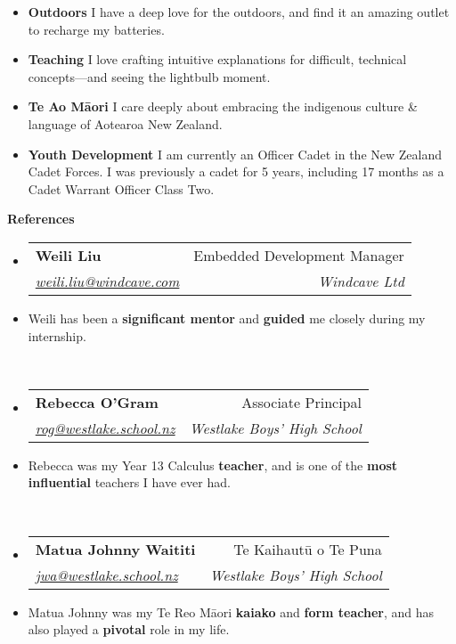 \documentclass[11pt,a4paper]{article}[leftmargin=*]
\makeatletter
\def \entryspacing {-0pt}
\renewcommand{\section}[2]{\vspace{5pt}
  \colorbox{secondary}{\color{white}\raggedbottom\normalsize\textbf{{#1}{\hspace{2pt}#2\hspace{4pt}}}}
}
\newcommand{\resumeEntryStart}{\begin{itemize}[leftmargin=2.5mm]}
\newcommand{\resumeEntryEnd}{\end{itemize}\vspace{\entryspacing}}
\newcommand{\resumeEntryTSDL}[4]{
  \vspace{-1pt}\item[]
    \begin{tabularx}{0.97\textwidth}{X@{\hspace{60pt}}r}
      \textbf{\color{primary}#1} & {\firabook\color{accent}\small#2} \\
      \textit{\color{accent}\small#3} & \textit{\color{accent}\small#4} \\
    \end{tabularx}\vspace{-6pt}
}
\newcommand{\resumeEntryS}[2]{
  \item[]\small{
    \textbf{\color{primary}#1 }{ #2 \vspace{-4pt}}
  }
}
\newcommand{\resumeEntryP}[1]{
  \item[]\small{
    #1 \vspace{-4pt}
  }\\
}
\newcommand{\resumeBf}[1]{\small\textbf{\color{halfbold}#1}}
\makeatother
\begin{document}
\resumeEntryStart
\resumeEntryS
{Outdoors}
{
  I have a deep love for the outdoors, and find it an amazing outlet to recharge my batteries.
}

\resumeEntryS
{Teaching}
{
  I love crafting intuitive explanations for difficult, technical concepts---and seeing the lightbulb moment.
}

\resumeEntryS
{Te Ao Māori}
{
  I care deeply about embracing the indigenous culture \& language of Aotearoa New Zealand.
}

\resumeEntryS
{Youth Development}
{
  I am currently an Officer Cadet in the New Zealand Cadet Forces. I was previously a cadet for 5 years, including 17 months as a Cadet Warrant Officer Class Two.
}
\resumeEntryEnd


\section{\faUserCheck}{References}

\resumeEntryStart
\resumeEntryTSDL
{Weili Liu}{Embedded Development Manager}
{\href{mailto:weili.liu@windcave.com}{weili.liu@windcave.com}}{Windcave Ltd}

\resumeEntryP{
  Weili has been a \resumeBf{significant mentor} and \resumeBf{guided} me closely during my internship.
}
\resumeEntryEnd

\resumeEntryStart
\resumeEntryTSDL
{Rebecca O'Gram}{Associate Principal}
{\href{mailto:rog@westlake.school.nz}{rog@westlake.school.nz}}{Westlake Boys' High School}

\resumeEntryP{
  Rebecca was my Year 13 Calculus \resumeBf{teacher}, and is one of the \resumeBf{most influential} teachers I have ever had.
}
\resumeEntryEnd

\resumeEntryStart
\resumeEntryTSDL
{Matua Johnny Waititi}{Te Kaihautū o Te Puna}
{\href{mailto:jwa@westlake.school.nz}{jwa@westlake.school.nz}}{Westlake Boys' High School}

\resumeEntryP{
  Matua Johnny was my Te Reo Māori \resumeBf{kaiako} and \resumeBf{form teacher}, and has also played a \resumeBf{pivotal} role in my life.
}
\resumeEntryEnd
\end{document}
